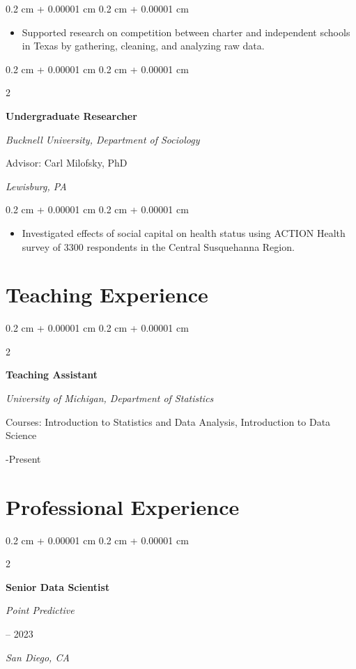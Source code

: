 \documentclass[11pt, letterpaper]{article}
\newenvironment{highlights}{
    \begin{itemize}[
        topsep=0.10 cm,
        parsep=0.10 cm,
        partopsep=0pt,
        itemsep=0pt,
        leftmargin=0.4 cm + 10pt
    ]
}{
    \end{itemize}
} %
\newenvironment{onecolentry}{
    \begin{adjustwidth}{
        0.2 cm + 0.00001 cm
    }{
        0.2 cm + 0.00001 cm
    }
}{
    \end{adjustwidth}
} %
\newenvironment{twocolentry}[2][]{
    \onecolentry
    \def\secondColumn{#2}
    \setcolumnwidth{\fill, 4.5 cm}
    \begin{paracol}{2}
}{
    \switchcolumn \raggedleft \secondColumn
    \end{paracol}
    \endonecolentry
} %
\begin{document}
\vspace{0.05 cm}
\begin{onecolentry}
    \begin{highlights}
        \item Supported research on competition between charter and independent schools in Texas by gathering, cleaning, and analyzing raw data.
    \end{highlights}
\end{onecolentry}


\pagebreak
\begin{twocolentry}{2013

        \textit{Lewisburg, PA}
    }
    \textbf{Undergraduate Researcher}

    \textit{Bucknell University, Department of Sociology}

    Advisor: Carl Milofsky, PhD
\end{twocolentry}

\vspace{0.05 cm}
\begin{onecolentry}
    \begin{highlights}
        \item  Investigated eﬀects of social capital on health status using ACTION Health
        survey of 3300 respondents in the Central Susquehanna Region.
    \end{highlights}
\end{onecolentry}

\section{Teaching Experience}

\begin{twocolentry}{2024-Present}
    \textbf{Teaching Assistant}

    \textit{University of Michigan, Department of Statistics}

    Courses: Introduction to Statistics and Data Analysis, Introduction to Data Science


\end{twocolentry}


\section{Professional Experience}

\begin{twocolentry}{
        2021 – 2023

        \textit{San Diego, CA}
    }
    \textbf{Senior Data Scientist}

    \textit{Point Predictive}
\end{twocolentry}
\end{document}
